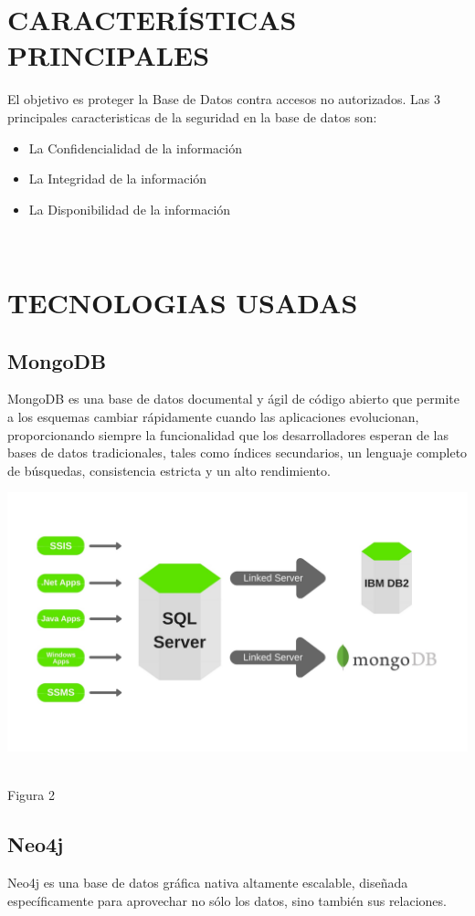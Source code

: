 \documentclass[conference]{IEEEtran}
\begin{document}
\section{CARACTERÍSTICAS PRINCIPALES}
El objetivo es proteger la Base de Datos contra
accesos no autorizados.
Las 3 principales caracteristicas de la seguridad en la base de datos son:
\begin{itemize}
\item \textbf{}La Confidencialidad de la información
\item \textbf{}La Integridad de la información
\item \textbf{}La Disponibilidad de la información
\end{itemize}
\\


\section{TECNOLOGIAS USADAS}
\subsection{MongoDB}
MongoDB es una base de datos documental y \'agil de c\'odigo abierto que permite a los esquemas cambiar r\'apidamente cuando las aplicaciones evolucionan, proporcionando siempre la funcionalidad que los desarrolladores esperan de las bases de datos tradicionales, tales como \'indices secundarios, un lenguaje completo de b\'usquedas, consistencia estricta y un alto rendimiento.\cite{mongo}
\\
\begin{flushright}
\includegraphics[scale=0.15]{Imagenes/mongodbsql.jpg}
\end{flushright}
\centering
\\Figura 2
\subsection{Neo4j}
Neo4j es una base de datos gr\'afica nativa altamente escalable, diseñada espec\'ificamente para aprovechar no s\'olo los datos, sino tambi\'en sus relaciones.
\end{document}
